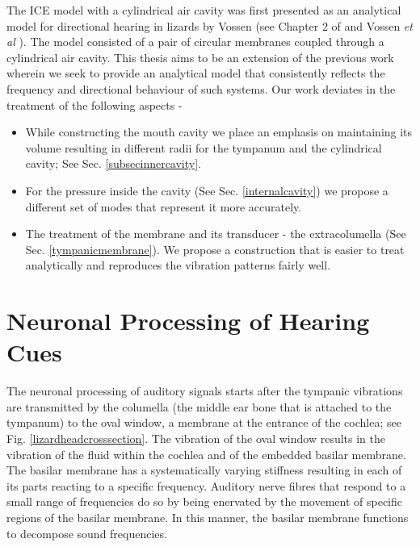  The ICE model with a cylindrical air cavity was first presented as an analytical model for
directional hearing in lizards  by Vossen (see Chapter 2 of \cite{vossenthesis} and Vossen \emph{et al} \cite{vossenjasa}).
The model consisted of a pair of circular membranes coupled through a cylindrical air cavity. This thesis aims to be an extension of the previous work
wherein we seek to provide an analytical model that consistently reflects the frequency and directional behaviour of such systems. Our work deviates in
the treatment of the following aspects - 
\begin{itemize}
 \item While constructing the mouth cavity we place an emphasis on maintaining its volume resulting in different radii for the tympanum and the cylindrical cavity; See Sec. \ref{subsecinnercavity}.
 \item For the pressure inside the cavity (See Sec. \ref{internalcavity}) we propose a different set of modes that represent it more accurately.
 \item The treatment of the membrane and its transducer - the extracolumella (See Sec. \ref{tympanicmembrane}). We propose a construction that is easier to treat analytically and reproduces
 the vibration patterns fairly well.
 \end{itemize}

\section{Neuronal Processing of Hearing Cues}\label{iceneuro}
The neuronal processing of auditory signals starts after the tympanic vibrations are transmitted by the columella (the middle ear bone that is attached to the tympanum)
to the oval window, a membrane at the entrance of the cochlea; see Fig. \ref{lizardheadcrosssection}. The vibration of the oval window results in the vibration of
the fluid within the cochlea and of the embedded basilar membrane. The basilar membrane has a systematically varying stiffness resulting in each of its parts 
reacting to a specific frequency. Auditory nerve fibres that respond to a small range of frequencies do so by being enervated by the movement of specific
regions of the basilar membrane. In this manner, the basilar membrane functions to decompose sound frequencies.

